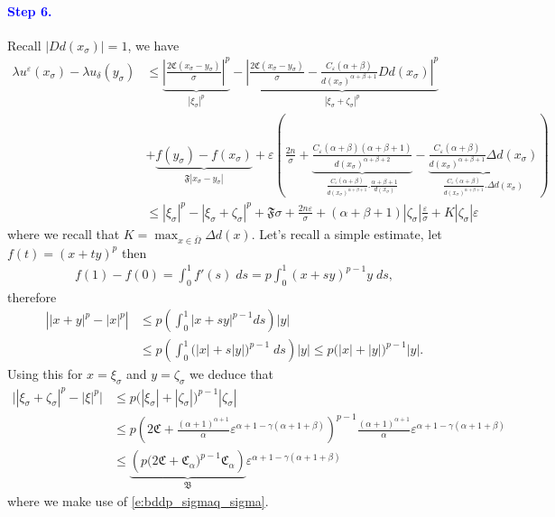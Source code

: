 \documentclass[11pt,reqno]{amsart}
\numberwithin{figure}{section}
\theoremstyle{plain}
\theoremstyle{remark}
\numberwithin{equation}{section}
\begin{document}
\paragraph{\textcolor{blue}{\textbf{Step 6.}}} Recall $|D d(x_\sigma)| = 1$, we have
\begin{align}
    \lambda u^\varepsilon(x_\sigma) - \lambda u_\delta(y_\sigma) &\leq \underbrace{\left|\frac{2\mathfrak{C}(x_\sigma-y_\sigma)}{\sigma}\right|^p}_{|\xi_\sigma|^p} - \underbrace{ \left|\frac{2\mathfrak{C}(x_\sigma-y_\sigma)}{\sigma} - \frac{C_\varepsilon(\alpha+\beta)}{d(x_\sigma)^{\alpha+\beta+1}}D d(x_\sigma )\right|^p}_{|\xi_\sigma+\zeta_\sigma|^p} \nonumber\\
    &+ \underbrace{f(y_\sigma) - f(x_\sigma)}_{\mathfrak{F}|x_\sigma - y_\sigma|} + \varepsilon\left(\frac{2n}{\sigma} + \underbrace{\frac{C_\varepsilon(\alpha+\beta)(\alpha+\beta+1)}{d(x_\sigma)^{\alpha+\beta+2}}}_{\frac{C_\varepsilon (\alpha+\beta)}{d(x_\sigma)^{\alpha+\beta + 1}}.\frac{\alpha+\beta+1}{d(x_\sigma)}}-\underbrace{\frac{C_\varepsilon(\alpha+\beta)}{d(x_\sigma)^{\alpha+\beta+1}}\Delta d(x_\sigma)}_{\frac{C_\varepsilon(\alpha+\beta)}{d(x_\sigma)^{\alpha+\beta+1}}.\Delta d(x_\sigma)}\right)\nonumber\\
    &\leq |\xi_\sigma|^p - |\xi_\sigma+\zeta_\sigma|^p + \mathfrak{F}\sigma + \frac{2n\varepsilon}{\sigma} + (\alpha+\beta+1)|\zeta_\sigma|\frac{\varepsilon}{\sigma} + K|\zeta_\sigma|\varepsilon \label{e:est3}
\end{align}
where we recall that $K = \max_{x\in \overline{\Omega}}\Delta d(x)$. Let's recall a simple estimate, let $f(t) = (x+ty)^p$ then
\begin{align*}
    f(1) - f(0) = \int_ 0^1 f'(s)\;ds = p\int_0^1 (x+sy)^{p-1}y\;ds,
\end{align*}
therefore
\begin{align*}
    \left||x+y|^p - |x|^p \right| &\leq p \left(\int_0^1 |x+sy|^{p-1}ds\right)|y|\\
    &\leq p\left(\int_0^1\Big(|x|+s|y|\Big)^{p-1}\;ds\right)|y| \leq  p\Big(|x|+|y|\Big)^{p-1}|y|.
\end{align*}
Using this for $x = \xi_\sigma$ and $y = \zeta_\sigma$ we deduce that
\begin{align}
    \Big||\xi_\sigma+\zeta_\sigma|^p - |\xi|^p\Big| &\leq p\Big(|\xi_\sigma|+|\zeta_\sigma|\Big)^{p-1}|\zeta_\sigma|\nonumber\\
    &\leq p\left(2\mathfrak{C} + \frac{(\alpha+1)^{\alpha+1}}{\alpha}\varepsilon^{\alpha+1 - \gamma(\alpha+1+\beta)}\right)^{p-1}\frac{(\alpha+1)^{\alpha+1}}{\alpha}\varepsilon^{\alpha+1 - \gamma(\alpha+1+\beta)}\nonumber\\
    &\leq \underbrace{\left(p\big(2\mathfrak{C} + \mathfrak{C}_\alpha\big)^{p-1} \mathfrak{C}_\alpha \right)}_{\mathfrak{B}}\varepsilon^{\alpha+1 - \gamma(\alpha+1+\beta)} \label{e:est2}
\end{align}
where we make use of \eqref{e:bddp_sigmaq_sigma}.
\end{document}
